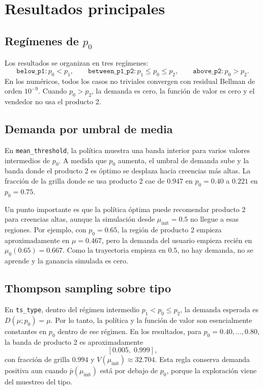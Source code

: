 \documentclass[11pt]{article}
\begin{document}
\section{Resultados principales}

\subsection{\texorpdfstring{Regímenes de \(p_0\)}{Regimenes de p0}}

Los resultados se organizan en tres regímenes:
\[
\texttt{below\_p1}:p_0<p_1,
\qquad
\texttt{between\_p1\_p2}:p_1\le p_0\le p_2,
\qquad
\texttt{above\_p2}:p_0>p_2.
\]
En los numéricos, todos los casos no triviales convergen con residual Bellman de
orden \(10^{-9}\). Cuando \(p_0>p_2\), la demanda es cero, la función de valor es
cero y el vendedor no usa el producto 2.

\subsection{Demanda por umbral de media}

En \texttt{mean\_threshold}, la política muestra una banda interior para varios
valores intermedios de \(p_0\). A medida que \(p_0\) aumenta, el umbral de demanda
sube y la banda donde el producto 2 es óptimo se desplaza hacia creencias más
altas. La fracción de la grilla donde se usa producto 2 cae de \(0.947\) en
\(p_0=0.40\) a \(0.221\) en \(p_0=0.75\).

Un punto importante es que la política óptima puede recomendar producto 2 para
creencias altas, aunque la simulación desde \(\mu_{\mathrm{init}}=0.5\) no llegue
a esas regiones. Por ejemplo, con \(p_0=0.65\), la región de producto 2 empieza
aproximadamente en \(\mu=0.467\), pero la demanda del usuario empieza recién en
\(\mu_0(0.65)=0.667\). Como la trayectoria empieza en \(0.5\), no hay demanda,
no se aprende y la ganancia simulada es cero.

\subsection{Thompson sampling sobre tipo}

En \texttt{ts\_type}, dentro del régimen intermedio \(p_1<p_0\le p_2\), la
demanda esperada es \(D(\mu;p_0)=\mu\). Por lo tanto, la política y la función de
valor son esencialmente constantes en \(p_0\) dentro de ese régimen. En los
resultados, para \(p_0=0.40,\ldots,0.80\), la banda de producto 2 es
aproximadamente
\[
[0.005,\;0.999],
\]
con fracción de grilla \(0.994\) y \(V(\mu_{\mathrm{init}})\approx 32.704\).
Esta regla conserva demanda positiva aun cuando \(\bar p(\mu_{\mathrm{init}})\)
está por debajo de \(p_0\), porque la exploración viene del muestreo del tipo.
\end{document}
